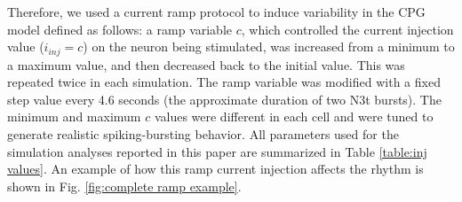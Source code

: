 Therefore, we used a current ramp protocol to induce variability in the CPG model defined as follows: a ramp variable $c$, which controlled the current injection value ($i_{inj}=c$) %
on the neuron being stimulated, was increased from a minimum to a maximum value, and then decreased back to the initial value. This was repeated twice in each simulation. The ramp variable was modified with a fixed step value every 4.6 seconds (the approximate duration of two N3t bursts).
The minimum and maximum $c$ values were different in each cell and were %
tuned to generate realistic spiking-bursting behavior. %
All parameters used for the simulation analyses reported in this paper are summarized in Table \ref{table:inj values}. An example of how this ramp current injection affects the rhythm is shown in Fig. \ref{fig:complete ramp example}. 


